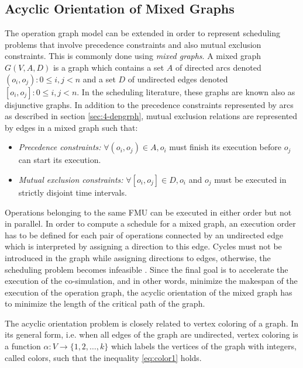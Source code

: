 \subsection{Acyclic Orientation of Mixed Graphs}

The operation graph model can be extended in order to represent scheduling problems that involve precedence constraints and also mutual exclusion constraints. This is commonly done using \textit{mixed graphs}. A mixed graph $G(V,A,D)$ is a graph which contains a set $A$ of directed arcs denoted $(o_i,o_j): 0 \leq i, j < n$ and a set $D$ of undirected edges denoted $[o_i,o_j]: 0 \leq i, j < n$. In the scheduling literature, these graphs are known also as disjunctive graphs. In addition to the precedence constraints represented by arcs as described in section \ref{sec:4-depgrph}, mutual exclusion relations are represented by edges in a mixed graph such that: 
\begin{itemize}
\item \textit{Precedence constraints:} $\forall (o_i,o_j) \in A, o_i$ must finish its execution before $o_j$ can start its execution.  
\item \textit{Mutual exclusion constraints:} $\forall [o_i,o_j] \in D, o_i$ and $o_j$ must be executed in strictly disjoint time intervals.
\end{itemize}

Operations belonging to the same FMU can be executed in either order but not in parallel. In order to compute a schedule for a mixed graph, an execution order has to be defined for each pair of operations connected by an undirected edge which is interpreted by assigning a direction to this edge. Cycles must not be introduced in the graph while assigning directions to edges, otherwise, the scheduling problem becomes infeasible \cite{}. Since the final goal is to accelerate the execution of the co-simulation, and in other words, minimize the makespan of the execution of the operation graph, the acyclic orientation of the mixed graph has to minimize the length of the critical path of the graph.

The acyclic orientation problem is closely related to vertex coloring of a graph. In its general form, i.e. when all edges of the graph are undirected, vertex coloring is a function $\alpha: V \rightarrow \{1, 2, \ldots, k\}$ which labels the vertices of the graph with integers, called colors, such that the inequality \ref{eq:color1} holds.

